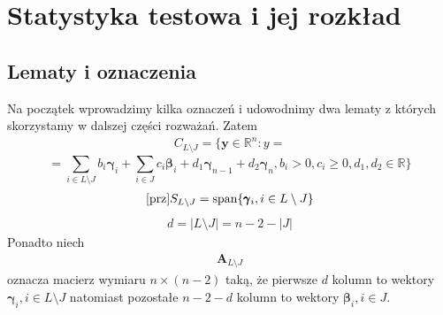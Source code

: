 \documentclass[12pt]{mwart}
\begin{document}
\section{Statystyka testowa i jej rozkład}
\subsection{Lematy i oznaczenia}
Na początek wprowadzimy kilka oznaczeń i udowodnimy dwa lematy z których skorzystamy w dalszej części rozważań. Zatem
\begin{eqnarray}\label{zbior}
C_{L\setminus J}=\{\pmb{y}\in \mathbb{R}^n\colon y=
\end{eqnarray}$$=\sum_{i\in L\setminus J}{b_i\pmb{\gamma}_i}+\sum_{i\in J}{c_i\pmb{\beta}_i}+d_1\pmb{\gamma}_{n-1}+d_2\pmb{\gamma}_n,b_i>0,c_i\geq 0,d_1,d_2\in \mathbb{R}\}
$$
\begin{eqnarray}\ref{prz}
S_{L\setminus J}=\textrm{span}\{\pmb{\gamma}_i,i\in L\setminus J\}
\end{eqnarray}
\begin{eqnarray}\label{zmienna}
d=|L\setminus J|=n-2-|J|
\end{eqnarray}
Ponadto niech
\begin{eqnarray}\label{macierz}
\pmb{A}_{L\setminus J}
\end{eqnarray}
oznacza macierz wymiaru $n\times (n-2)$ taką, że pierwsze $d$ kolumn to wektory $\pmb{\gamma}_i,i\in L\setminus J$ natomiast pozostałe $n-2-d$ kolumn to wektory $\pmb{\beta}_i,i\in J.$
\end{document}
